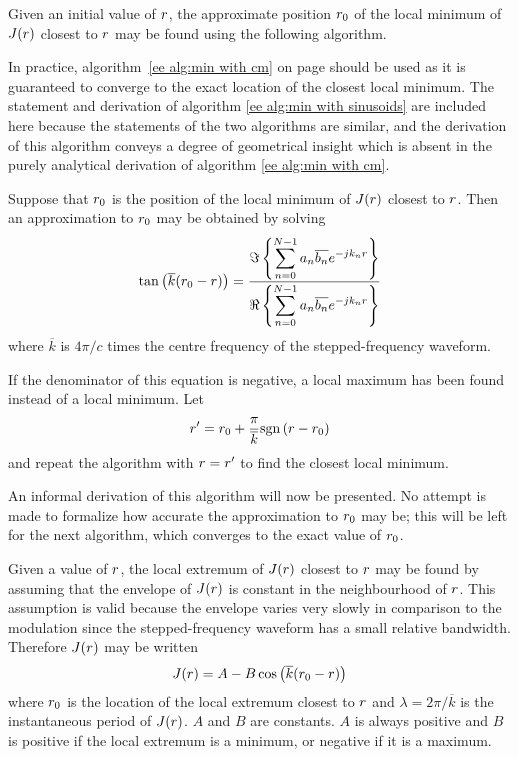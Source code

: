 Given an initial value of ${r}$, the approximate position ${r}_0$ of
the local minimum of $J({r})$ closest to ${r}$ may be found using
the following algorithm.  

In practice, algorithm~\ref{ee alg:min with cm} on page 
\pageref{ee alg:min with cm} should be used as it is guaranteed to converge
to the exact location of the closest local minimum.  The statement and
derivation of algorithm \ref{ee alg:min with sinusoids} are included here
because the statements of the two algorithms are similar, and the
derivation of this algorithm conveys a degree of geometrical insight which
is absent in the purely analytical derivation of algorithm
\ref{ee alg:min with cm}.

\begin{algorithm}
\label{ee alg:min with sinusoids}\mbox{}\par

Suppose that ${r}_0$ is the position of the local minimum of $J({r})$ closest
to ${r}$.  Then an approximation to ${r}_0$ may be obtained by solving
\begin{equation}
\tan\left(\overline{k}({r}_0-{r})\right)=
\frac{
  \Im\left\{\displaystyle\sum_{n=0}^{N-1}a_n\overline{b_n}{e^{-jk_n{r}}}\right\}
}{
  \Re\left\{\displaystyle\sum_{n=0}^{N-1}a_n\overline{b_n}{e^{-jk_n{r}}}\right\}
}
\end{equation}
where $\overline{k}$ is $4\pi/c$ times the centre frequency of the 
stepped-frequency waveform. 

If the denominator of this equation is negative, a local maximum has been
found instead of a local minimum.  Let
\begin{equation}
{r}'={r}_0+\frac{\pi}{\overline{k}}{\mathop{\rm sgn}\nolimits}\left({r}-{r}_0\right)
\end{equation}
and repeat the algorithm with ${r}={r}'$ to find the closest local minimum.
\end{algorithm}

An informal derivation of this algorithm will now be presented.  No attempt is
made to formalize how accurate the approximation to ${r}_0$ may be; this will
be left for the next algorithm, which converges to the exact value of ${r}_0$.

Given a value of ${r}$, the local extremum of $J({r})$ closest to ${r}$ may be
found by assuming that the envelope of $J({r})$ is constant in the
neighbourhood of ${r}$.  This assumption is valid because the envelope varies
very slowly in comparison to the modulation since the stepped-frequency
waveform has a small relative bandwidth.
Therefore $J({r})$ may be written
\begin{equation}\label{ee eqn:sin model}
J({r})=A-B\cos\left(\overline{k}({r}_0-{r})\right)
\end{equation}
where ${r}_0$ is the location of the local extremum closest to ${r}$ and
$\lambda=2\pi/\overline{k}$ is the instantaneous period of $J({r})$.  $A$ and
$B$ are constants.  $A$ is always positive and $B$ is positive if the local
extremum is a minimum, or negative if it is a maximum. 

